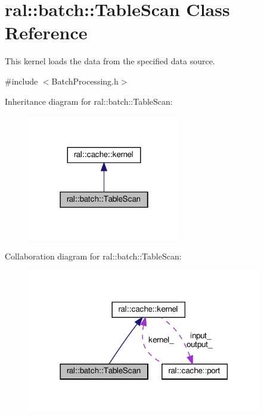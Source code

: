 \hypertarget{classral_1_1batch_1_1TableScan}{}\section{ral\+:\+:batch\+:\+:Table\+Scan Class Reference}
\label{classral_1_1batch_1_1TableScan}


This kernel loads the data from the specified data source.  




{\ttfamily \#include $<$Batch\+Processing.\+h$>$}



Inheritance diagram for ral\+:\+:batch\+:\+:Table\+Scan\+:\nopagebreak
\begin{figure}[H]
\begin{center}
\leavevmode
\includegraphics[width=190pt]{classral_1_1batch_1_1TableScan__inherit__graph}
\end{center}
\end{figure}


Collaboration diagram for ral\+:\+:batch\+:\+:Table\+Scan\+:\nopagebreak
\begin{figure}[H]
\begin{center}
\leavevmode
\includegraphics[width=290pt]{classral_1_1batch_1_1TableScan__coll__graph}
\end{center}
\end{figure}

